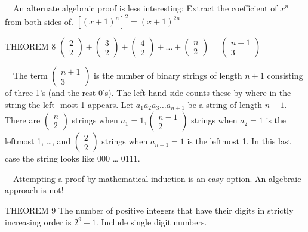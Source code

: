 \documentclass{article}
\begin{document}
\ \ An alternate algebraic proof is less interesting: Extract the coefficient of  $x^n$ from both sides of.
$\left[\left(x+1\right)^n\right]^2=\left(x+1\right)^{2n}$

THEOREM 8  
$\left(\begin{matrix}2\\2\end{matrix}\right)+\left(\begin{matrix}3\\2\end{matrix}\right)+\left(\begin{matrix}4\\2\end{matrix}\right)+{\dots}+\left(\begin{matrix}n\\2\end{matrix}\right)=\left(\begin{matrix}n+1\\3\end{matrix}\right)$

\ \ The term  $\left(\begin{matrix}n+1\\3\end{matrix}\right)$ is the number of binary strings of length  $n+1$
consisting of three 1’s (and the rest 0’s).  The left hand side counts these by where in the string the left- most 1
appears.  Let  $a_1a_2a_3{\dots}a_{n+1}$ be a string of length  $n+1$.  There are 
$\left(\begin{matrix}n\\2\end{matrix}\right)$ strings when  $a_1=1,\left(\begin{matrix}n-1\\2\end{matrix}\right)$
strings when  $a_2=1$ is the leftmost 1, …, and  $\left(\begin{matrix}2\\2\end{matrix}\right)$ strings when 
$a_{n-1}=1$ is the leftmost 1.  In this last case the string looks like 000 … 0111.

\ \ Attempting a proof by mathematical induction is an easy option.  An algebraic approach is not!

THEOREM 9  The number of positive integers that have their digits in strictly increasing order is  $2^9-1$.  Include
single digit numbers.
\end{document}
